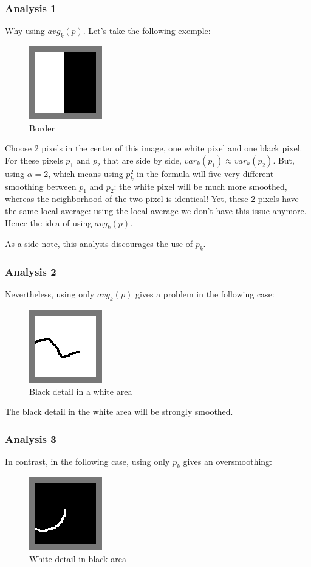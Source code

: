 \documentclass[12pt,a4paper]{article}
\begin{document}
\subsubsection{Analysis 1}
Why using $avg_k(p)$. Let's take the following exemple:

\begin{figure}[h]
\centering
\includegraphics[width=0.1\linewidth]{img/bord}
\caption{Border}
\label{fig:bord}
\end{figure}
Choose 2 pixels in the center of this image, one white pixel and one black pixel.
For these pixels $p_1$ and $p_2$ that are side by side, $var_k(p_1) \approx var_k(p_2)$.
But, using $\alpha = 2$, which means using $p_k^2$ in the formula will five very different smoothing between $p_1$ and $p_2$: the white pixel will be much more smoothed, whereas the neighborhood of the two pixel is identical!
Yet, these 2 pixels have the same local average: using the local average we don't have this issue anymore.
Hence the idea of using $avg_k(p)$.

As a side note, this analysis discourages the use of $p_k$.

\subsubsection{Analysis 2}
Nevertheless, using only $avg_k(p)$ gives a problem in the following case:
\begin{figure}[h]
\centering
\includegraphics[width=0.1\linewidth]{img/noir_dans_blanc}
\caption{Black detail in a white area}
\label{fig:ndb}
\end{figure}

The black detail in the white area will be strongly smoothed.

\subsubsection{Analysis 3}
In contrast, in the following case, using only $p_k$ gives an oversmoothing:
\begin{figure}[h]
\centering
\includegraphics[width=0.1\linewidth]{img/blanc_dans_noir}
\caption{White detail in black area}
\label{fig:bdn}
\end{figure}
\end{document}
